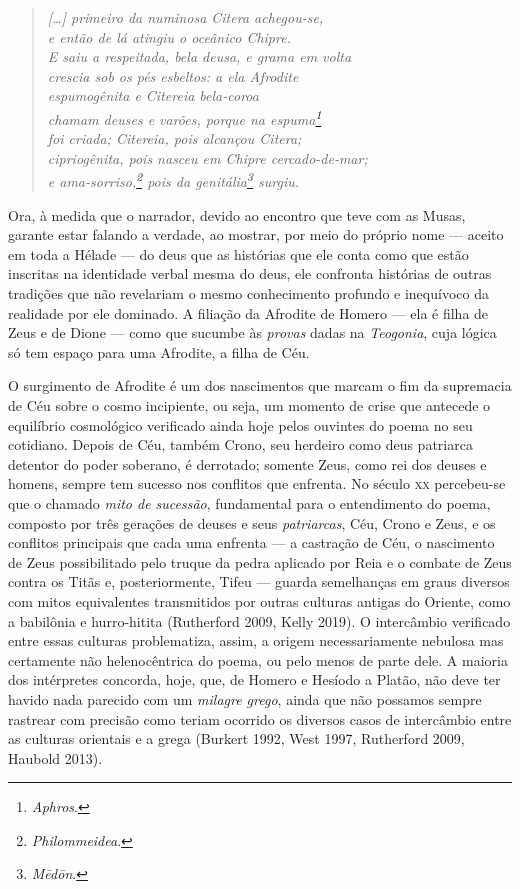 \begin{verse}
\textit{
{[}\ldots{}{]} primeiro da numinosa Citera achegou-se,\\
e então de lá atingiu o oceânico Chipre.\\
E saiu a respeitada, bela deusa, e grama em volta\\
crescia sob os pés esbeltos: a ela Afrodite\\ %
espumogênita e Citereia bela-coroa\\
chamam deuses e varões, porque na espuma\footnote{\textit{Aphros}.}\\
foi criada; Citereia, pois alcançou Citera;\\
cipriogênita, pois nasceu em Chipre cercado-de-mar;\\
e ama-sorriso,\footnote{\textit{Philommeidea}.} pois da genitália\footnote{\textit{Mēdōn}.} surgiu.
}
\end{verse}

Ora, à medida que o narrador, devido ao encontro que teve com as Musas,
garante estar falando a verdade, ao mostrar, por meio do próprio nome ---
aceito em toda a Hélade --- do deus que as histórias que ele conta como
que estão inscritas na identidade verbal mesma do deus, ele confronta
histórias de outras tradições que não revelariam o mesmo
conhecimento profundo e inequívoco da realidade por ele dominado. A
filiação da Afrodite de Homero --- ela é filha de Zeus e de Dione --- como
que sucumbe às \textit{provas} dadas na \textit{Teogonia}, cuja lógica só tem
espaço para uma Afrodite, a filha de Céu.

O surgimento de Afrodite é um dos nascimentos que marcam o fim da
supremacia de Céu sobre o cosmo incipiente, ou seja, um momento de crise
que antecede o equilíbrio cosmológico verificado ainda hoje pelos
ouvintes do poema no seu cotidiano. Depois de Céu, também Crono, seu
herdeiro como deus patriarca detentor do poder soberano, é derrotado;
somente Zeus, como rei dos deuses e homens, sempre tem sucesso nos
conflitos que enfrenta. No século \textsc{xx} percebeu-se que o chamado \textit{mito de
sucessão}, fundamental para o entendimento do poema, composto por três
gerações de deuses e seus \textit{patriarcas}, Céu, Crono e Zeus, e os
conflitos principais que cada uma enfrenta --- a castração de Céu, o
nascimento de Zeus possibilitado pelo truque da pedra aplicado por Reia
e o combate de Zeus contra os Titãs e, posteriormente, Tifeu --- guarda
semelhanças em graus diversos com mitos equivalentes transmitidos por
outras culturas antigas do Oriente, como a babilônia e hurro-hitita
(Rutherford 2009, Kelly 2019). O intercâmbio verificado entre essas
culturas problematiza, assim, a origem necessariamente nebulosa mas
certamente não helenocêntrica do poema, ou pelo menos de parte dele. A
maioria dos intérpretes concorda, hoje, que, de Homero e Hesíodo a
Platão, não deve ter havido nada parecido com um \textit{milagre grego},
ainda que não possamos sempre rastrear com precisão como teriam ocorrido
os diversos casos de intercâmbio entre as culturas orientais e a grega
(Burkert 1992, West 1997, Rutherford 2009, Haubold 2013).

